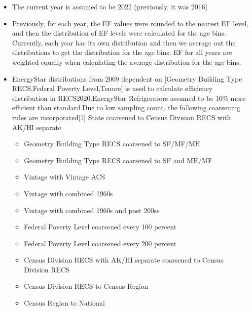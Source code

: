 \begin{itemize}
\item The current year is assumed to be 2022 (previously, it was 2016)
\item Previously, for each year, the EF values were rounded to the nearest EF level, and then the distribution of EF levels were calculated for the age bins. Currently, each year has its own distribution and then we average out the distributions to get the distribution for the age bins. EF for all years are weighted equally when calculating the average distribution for the age bins.
\item EnergyStar distributions from 2009 dependent on [Geometry Building Type RECS,Federal Poverty Level,Tenure] is used to calculate efficiency distribution in RECS2020.EnergyStar Refrigerators assumed to be 10\% more efficient than standard.Due to low sampling count, the following coarsening rules are incorporated[1] State coarsened to Census Division RECS with AK/HI separate
  \begin{itemize}
  \item Geometry Building Type RECS coarsened to SF/MF/MH
  \item Geometry Building Type RECS coarsened to SF and MH/MF
  \item Vintage with Vintage ACS
  \item Vintage with combined 1960s
  \item Vintage with combined 1960s and post 200ss
  \item Federal Poverty Level coarsened every 100 percent
  \item Federal Poverty Level coarsened every 200 percent
  \item Census Division RECS with AK/HI separate coarsened to Census Division RECS
  \item Census Division RECS to Census Region
  \item Census Region to National
  \end{itemize}
\end{itemize}
